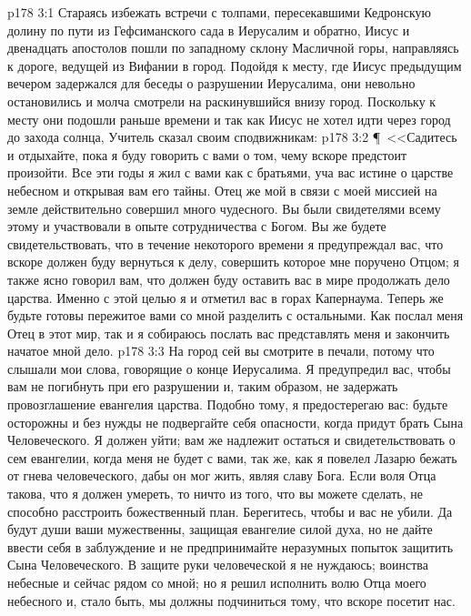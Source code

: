 \vs p178 3:1 Стараясь избежать встречи с толпами, пересекавшими Кедронскую долину по пути из Гефсиманского сада в Иерусалим и обратно, Иисус и двенадцать апостолов пошли по западному склону Масличной горы, направляясь к дороге, ведущей из Вифании в город. Подойдя к месту, где Иисус предыдущим вечером задержался для беседы о разрушении Иерусалима, они невольно остановились и молча смотрели на раскинувшийся внизу город. Поскольку к месту они подошли раньше времени и так как Иисус не хотел идти через город до захода солнца, Учитель сказал своим сподвижникам:
\vs p178 3:2 \P\ <<Садитесь и отдыхайте, пока я буду говорить с вами о том, чему вскоре предстоит произойти. Все эти годы я жил с вами как с братьями, уча вас истине о царстве небесном и открывая вам его тайны. Отец же мой в связи с моей миссией на земле действительно совершил много чудесного. Вы были свидетелями всему этому и участвовали в опыте сотрудничества с Богом. Вы же будете свидетельствовать, что в течение некоторого времени я предупреждал вас, что вскоре должен буду вернуться к делу, совершить которое мне поручено Отцом; я также ясно говорил вам, что должен буду оставить вас в мире продолжать дело царства. Именно с этой целью я и отметил вас в горах Капернаума. Теперь же будьте готовы пережитое вами со мной разделить с остальными. Как послал меня Отец в этот мир, так и я собираюсь послать вас представлять меня и закончить начатое мной дело.
\vs p178 3:3 На город сей вы смотрите в печали, потому что слышали мои слова, говорящие о конце Иерусалима. Я предупредил вас, чтобы вам не погибнуть при его разрушении и, таким образом, не задержать провозглашение евангелия царства. Подобно тому, я предостерегаю вас: будьте осторожны и без нужды не подвергайте себя опасности, когда придут брать Сына Человеческого. Я должен уйти; вам же надлежит остаться и свидетельствовать о сем евангелии, когда меня не будет с вами, так же, как я повелел Лазарю бежать от гнева человеческого, дабы он мог жить, являя славу Бога. Если воля Отца такова, что я должен умереть, то ничто из того, что вы можете сделать, не способно расстроить божественный план. Берегитесь, чтобы и вас не убили. Да будут души ваши мужественны, защищая евангелие силой духа, но не дайте ввести себя в заблуждение и не предпринимайте неразумных попыток защитить Сына Человеческого. В защите руки человеческой я не нуждаюсь; воинства небесные и сейчас рядом со мной; но я решил исполнить волю Отца моего небесного и, стало быть, мы должны подчиниться тому, что вскоре посетит нас.
